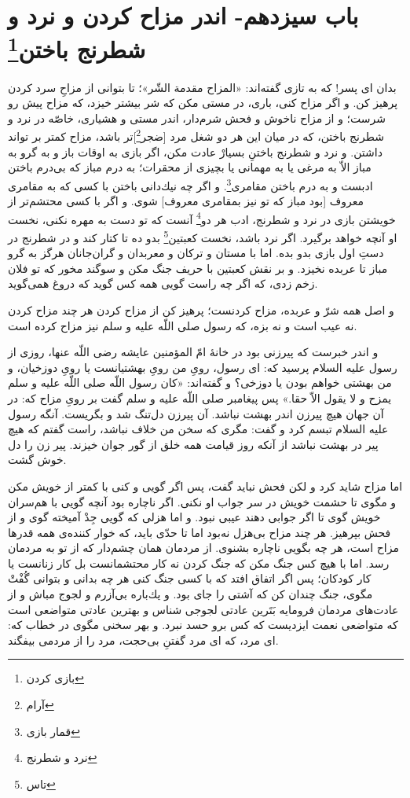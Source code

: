 
\section*{باب سيزدهم- 
اندر مزاح كردن و نرد و شطرنج باختن\footnote{بازی کردن}}

بدان اى پسر! كه به تازى گفته‌اند: «المزاح مقدمة الشّر»؛ تا بتوانى از مزاحِ سرد كردن پرهيز كن. و اگر مزاح كنى، بارى، در مستى مكن كه شر بيشتر خيزد، كه مزاح پيش رو شرست؛ و از مزاح ناخوش و فحش شرم‌دار، اندر مستى و هشيارى، خاصّه در نرد و شطرنج باختن، كه در ميان اين هر دو شغل مرد [ضجر\footnote{آرام}]تر باشد، مزاح كمتر بر تواند داشتن. و نرد و شطرنج باختنِ بسيارْ عادت مكن، اگر بازى به اوقات باز و به گرو به‌ مباز الاّ به مرغى يا به مهمانى يا بچيزى از محقرات؛ به درم مباز كه بى‌درم باختن ادبست و به درم باختن مقامرى\footnote{قمار بازی}. و اگر چه نيك‌دانى باختن با كسى كه به مقامرى معروف [بود مباز كه تو نيز بمقامرى معروف] شوى. و اگر با كسى محتشم‌تر از خويشتن بازى در نرد و شطرنج، ادب هر دو\footnote{نرد و شطرنج} آنست كه تو دست به مهره نكنى، نخست او آنچه خواهد برگيرد. اگر نرد باشد، نخست كعبتين\footnote{تاس} بدو ده تا كتار كند و در شطرنج در دستِ اول بازى بدو بده. اما با مستان و تركان و معربدان و گران‌جانان هرگز به گرو مباز تا عربده نخيزد. و بر نقش كعبتين با حريف جنگ مكن و سوگند مخور كه تو فلان زخم زدى، كه اگر چه راست گويى همه كس گويد كه دروغ همى‌گويد.

و اصل همه شرّ و عربده، مزاح كردنست؛ پرهيز كن از مزاح كردن هر چند مزاح كردن نه عيب است و نه بزه، كه رسول صلى اللّه عليه و سلم نيز مزاح كرده است. 

و اندر خبرست كه پيرزنى بود در خانۀ امّ المؤمنين عايشه رضى اللّه عنها، روزى از رسول عليه السلام پرسيد كه: اى رسول، روىِ من روىِ بهشتيانست يا روىِ دوزخيان، و من بهشتى خواهم بودن يا دوزخى‌؟ و گفته‌اند: «كان رسول اللّه صلى اللّه عليه و سلم يمزح و لا يقول الاّ حقا.» پس پيغامبر صلى اللّه عليه و سلم گفت بر روىِ مزاح كه: در آن جهان هيچ پيرزن اندر بهشت نباشد. آن پيرزن دل‌تنگ شد و بگريست. آنگه رسول عليه السلام تبسم كرد و گفت: مگرى كه سخن من خلاف نباشد، راست گفتم كه هيچ پير در بهشت نباشد از آنكه روز قيامت همه خلق از گور جوان خيزند. پير زن را دل خوش گشت. 

اما مزاح شايد كرد و لكن فحش نبايد گفت، پس اگر گويى و كنى با كمتر از خويش مكن و مگوى تا حشمت خويش در سر جواب او نكنى. اگر ناچاره بود آنچه گويى با هم‌سران خويش گوى تا اگر جوابى  دهند عيبى نبود. و اما هزلى كه گويى جِدْ آميخته گوى و از فحش بپرهيز. هر چند مزاح بى‌هزل نه‌بود اما تا حدّى بايد، كه خوار كننده‌ی همه قدرها مزاح است، هر چه بگويى ناچاره بشنوى. از مردمان همان چشم‌دار كه از تو به مردمان رسد. اما با هيچ كس جنگ مكن كه جنگ كردن نه كار محتشمانست بل كار زنانست يا كار كودكان؛ پس اگر اتفاق افتد كه با كسى جنگ كنى هر چه بدانى و بتوانى گُفْتْ مگوى، جنگ چندان كن كه آشتى را جاى بود. و يك‌باره بى‌آزرم و لجوج مباش و از عادت‌هاى مردمان فرومايه بَتَرين عادتى لجوجى شناس و بهترين عادتى متواضعى است كه متواضعى نعمت ايزديست كه كس برو حسد نبرد. و بهر سخنى مگوى در خطاب كه: اى مرد، كه اى مرد گفتنِ بى‌حجت، مرد را از مردمى بيفگند.

